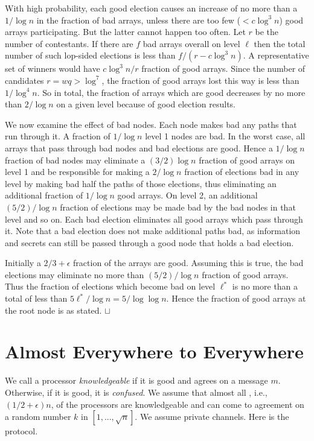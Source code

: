 \documentclass[letterpaper,11pt]{article}
\newcommand{\sq}{\hbox{\rlap{$\sqcap$}$\sqcup$}}
\newcommand{\qed}{\hspace*{\fill}\sq}
\newenvironment{proof}{\noindent {\bf Proof:}}{\qed\par\vskip 4mm\par}
\begin{document}
\begin{proof}
With high probability, each good election causes an increase of  no more than a $1/\log n$ in the fraction of bad arrays, unless
there are too few ($<  c \log^3 n$) good arrays participating.   But the latter cannot happen too often.  Let $r$ be the number of contestants.
 If there are $f$ bad arrays overall on level $\ell$ then the total number of such lop-sided elections  is less than $f/(r-c \log^ 3 n)$. A representative set
 of winners would have $c \log^3 n/ r$ fraction of good arrays. Since the number of candidates $r=wq > \log^7$, the fraction of good arrays lost this way is less  than $1/\log^4 n$.
   So in total, the fraction of arrays which are good decreases by no more than $2/\log  n$ on a given level because of good election results.

 We now examine the effect of bad nodes. Each node makes bad any paths that run through it.  A fraction of $1/\log n$ level 1 nodes are bad. In the worst case, all arrays that pass through bad nodes and bad elections are good. Hence  a $1/\log n$ fraction of  bad nodes may eliminate a
$(3/2)\log n$ fraction of good arrays on level 1 and be responsible for making a $2/\log n$ fraction of elections bad in any level  by making bad half the paths of those elections, thus eliminating an additional fraction of $1/\log n$ good arrays.  On level 2, an additional $(5/2)/\log n$ fraction of elections may be made bad by the bad nodes in that level and so on.  Each bad election eliminates all good arrays which pass through it. Note that a bad election does not make additional paths bad, as information and secrets can still be passed through a good node that holds a bad election. 

 Initially a $2/3 + \epsilon $ fraction of the arrays are good. Assuming this is true,  the bad elections  may eliminate no more than $(5/2)/\log n$ fraction of good arrays.  Thus the fraction of elections which become bad on level $\ell^*$  is no more than a total of less than $5 \ell^*/\log n=5/\log \log n$.  Hence the fraction of good arrays at the root node is as stated. 
\end{proof}  

\section{Almost Everywhere to Everywhere}\label{s:AE2E}
We call a processor {\it knowledgeable} if it is good and agrees on a message $m$.   Otherwise, if it is good, it is {\it confused}.  We assume that almost all , i.e., $(1/2+\epsilon )n$,  of the processors are  knowledgeable and can come to agreement on a random number  $k$ in $[1,...,\sqrt{n}]$. We assume private channels.  Here is the protocol.
\end{document}
